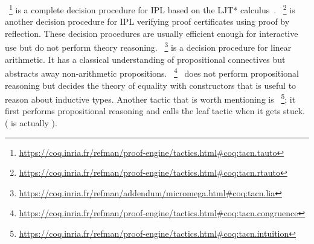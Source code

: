 \documentclass[utf8,a4paper,UKenglish,cleveref, autoref, thm-restate]{lipics-v2019}
\begin{document}
~\footnote{\url{https://coq.inria.fr/refman/proof-engine/tactics.html\#coq:tacn.tauto}}
is a complete decision procedure for IPL based on the LJT*
calculus~\cite{Dyckhoff92}.
~\footnote{\url{https://coq.inria.fr/refman/proof-engine/tactics.html\#coq:tacn.rtauto}}
is another decision procedure for IPL verifying proof certificates
using proof by reflection. %
These decision procedures are usually efficient enough for interactive
use but do not perform theory
reasoning. ~\footnote{\url{https://coq.inria.fr/refman/addendum/micromega.html\#coq:tacn.lia}}
is a decision procedure for linear arithmetic. It has a classical
understanding of propositional connectives but abstracts away
non-arithmetic
propositions. ~\footnote{\url{https://coq.inria.fr/refman/proof-engine/tactics.html\#coq:tacn.congruence}}~\cite{Corbineau06}
does not perform propositional reasoning but decides the theory of
equality with constructors that is useful to reason about inductive
types. Another tactic that is worth mentioning is ~\footnote{\url{https://coq.inria.fr/refman/proof-engine/tactics.html\#coq:tacn.intuition}};
it first performs propositional reasoning and calls the leaf tactic
 when it gets stuck. ( is actually
).
\end{document}
